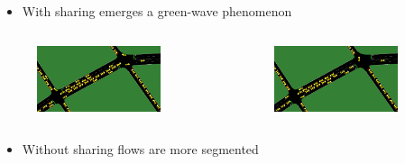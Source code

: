 \documentclass[dvipsnames]{beamer}
\begin{document}
\begin{frame}
  \begin{itemize}
    \item With sharing emerges a green-wave phenomenon
  \end{itemize}

  \begin{columns}
    \begin{column}{0.5\textwidth}
      \begin{figure}
        \centering
        \includegraphics[width=0.85\textwidth]{figures/dql-shared.0.png}
      \end{figure}
    \end{column}
    \begin{column}{0.5\textwidth}
      \begin{figure}
        \centering
        \includegraphics[width=0.85\textwidth]{figures/dql-shared.1.png}
      \end{figure}
    \end{column}
  \end{columns}

  \vspace{3mm}
  \begin{itemize}
    \item Without sharing flows are more segmented
  \end{itemize}
  

\end{frame}
\end{document}
